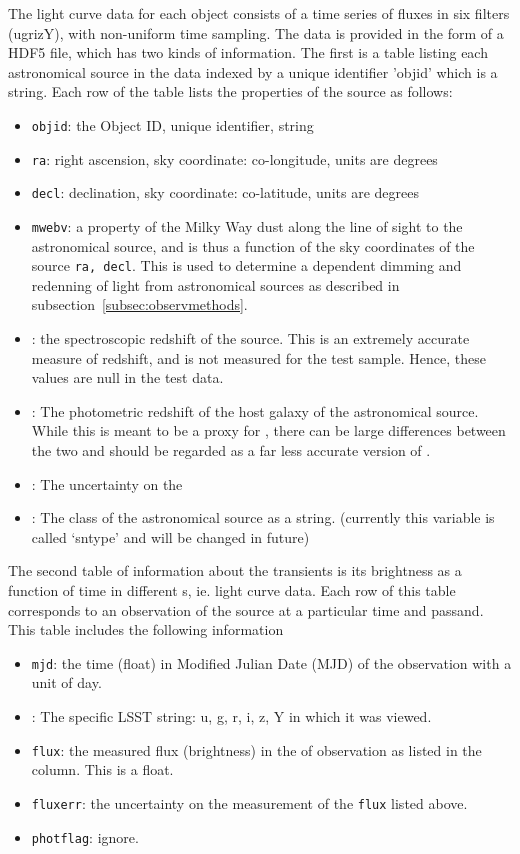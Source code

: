 \documentclass[iop,twocolumn]{emulateapj}
\newcommand{\<}      {\langle}
\renewcommand{\>}    {\rangle}
\begin{document}
The light curve data for each object consists 
of a time series of fluxes in six filters (ugrizY), 
with non-uniform  time sampling.
The {\plasticc} data is provided in the form of a HDF5 file, which has two kinds of information. The first
is a table listing each astronomical source in the data indexed by a unique identifier 'objid' which is a string. Each row of the table lists the properties of the source as follows: 
\begin{itemize}
\item {\tt objid}: the Object ID, unique identifier, string
\item {\tt ra}: right ascension, sky coordinate: co-longitude, units are degrees
\item {\tt decl}: declination, sky coordinate: co-latitude, units are degrees
\item {\tt mwebv}: a property of the Milky Way dust along the line of sight to the astronomical source, and is thus a function of the sky coordinates of the source {\tt ra, decl}. This is used  to determine a {\passband} dependent dimming and redenning of light from astronomical sources as described in subsection~\ref{subsec:observmethods}.
\item {\specz}: the spectroscopic redshift of the source. This is an extremely accurate measure of redshift, 
    and is not measured for the test sample. Hence, these values are null in the test data.
\item {\hostphotoz} : The photometric redshift of the host galaxy of the astronomical source. While this is meant to be a proxy for {\specz}, there can be large differences between the two and should be regarded as a far less accurate version of {\specz}. 
\item {\hostphotozerr} : The uncertainty on the {\hostphotoz}
\item {\class} : The class of the astronomical source as a string. (currently this variable is called `sntype' and will be changed in future)
\end{itemize}

The second table of information about the transients is its brightness as a function of time in different {\passband}s, ie. light curve data. Each row of this table corresponds to an observation of the source at a particular time and passand.  This table includes the following information
\begin{itemize}
\item {\tt mjd}: the time (float) in Modified Julian Date (MJD) of the observation with a unit of day.
\item {\passband} : The specific LSST {\passband} string: u, g, r, i, z, Y in which it was viewed. 
\item {\tt flux}: the measured flux (brightness) in the {\passband} of observation as listed in the {\passband} column. This is a float.
\item {\tt fluxerr}: the uncertainty on the measurement of the {\tt flux}  listed above.
\item {\tt photflag}: ignore.
\end{itemize}
\end{document}
